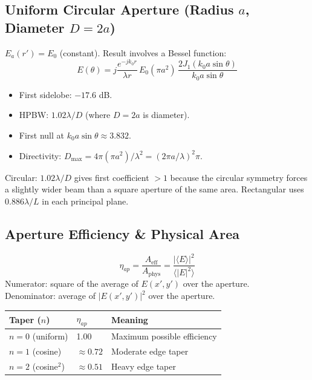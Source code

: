 \documentclass[10pt,letterpaper]{article}
\newcommand{\Aeff}{A_{\mathrm{eff}}}
\newcommand{\Aphys}{A_{\mathrm{phys}}}
\begin{document}
\subsection{Uniform Circular Aperture (Radius $a$, Diameter $D = 2a$)}

$E_a(r') = E_0$ (constant). Result involves a Bessel function:
\begin{equation}
  E(\theta) = j\frac{e^{-jk_0 r}}{\lambda r}\,E_0(\pi a^2)\,\frac{2J_1(k_0 a\sin\theta)}{k_0 a\sin\theta}
\end{equation}
\begin{itemize}[noitemsep]
  \item First sidelobe: $-17.6$ dB.
  \item HPBW: $1.02\lambda/D$ (where $D = 2a$ is diameter).
  \item First null at $k_0 a\sin\theta \approx 3.832$.
  \item Directivity: $D_\mathrm{max} = 4\pi(\pi a^2)/\lambda^2 = (2\pi a/\lambda)^2\pi$.
\end{itemize}

\begin{tcolorbox}[warningbox, title={Common Mistake: Circular vs.\ Rectangular HPBW}]
Circular: $1.02\lambda/D$ gives first coefficient $> 1$ because the circular symmetry forces a slightly wider beam than a square aperture of the same area. Rectangular uses $0.886\lambda/L$ in each principal plane.
\end{tcolorbox}

\subsection{Aperture Efficiency \& Physical Area}

\begin{tcolorbox}[formulabox, title={Aperture Efficiency}]
\begin{equation}
  \eta_{ap} = \frac{\Aeff}{\Aphys} = \frac{|\langle E\rangle|^2}{\langle|E|^2\rangle}
\end{equation}
Numerator: square of the average of $E(x',y')$ over the aperture.\\
Denominator: average of $|E(x',y')|^2$ over the aperture.
\begin{center}
\begin{tabular}{lll}
\toprule
\textbf{Taper ($n$)} & \textbf{$\eta_{ap}$} & \textbf{Meaning} \\
\midrule
$n=0$ (uniform) & 1.00 & Maximum possible efficiency \\
$n=1$ (cosine) & $\approx 0.72$ & Moderate edge taper \\
$n=2$ (cosine$^2$) & $\approx 0.51$ & Heavy edge taper \\
\bottomrule
\end{tabular}
\end{center}
\end{tcolorbox}
\end{document}
